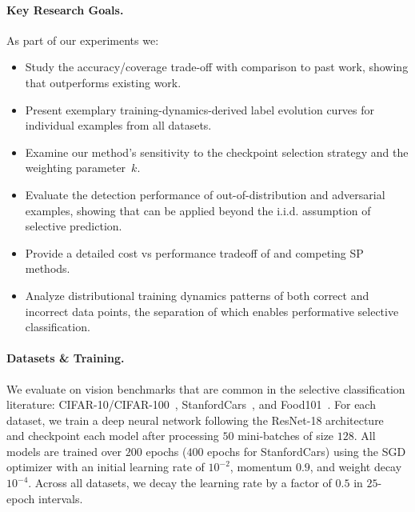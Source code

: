 \paragraph{Key Research Goals.} As part of our experiments we:
\begin{itemize}
    \item Study the accuracy/coverage trade-off with comparison to past work, showing that \sptd outperforms existing work.
    \item Present exemplary training-dynamics-derived label evolution curves for individual examples from all datasets.
    \item Examine our method's sensitivity to the checkpoint selection strategy and the weighting parameter~$k$.
    \item Evaluate the detection performance of out-of-distribution and adversarial examples, showing that \sptd can be applied beyond the i.i.d. assumption of selective prediction.
    \item Provide a detailed cost vs performance tradeoff of \sptd and competing SP methods.
    \item Analyze distributional training dynamics patterns of both correct and incorrect data points, the separation of which enables performative selective classification.
\end{itemize} 

\paragraph{Datasets \& Training.} We evaluate \sptd on vision benchmarks that are common in the selective classification literature: CIFAR-10/CIFAR-100~\citep{krizhevsky2009learning}, StanfordCars~\citep{krause20133d}, and Food101~\citep{bossard14}. For each dataset, we train a deep neural network following the ResNet-18 architecture~\citep{he2016deep} and checkpoint each model after processing $50$ mini-batches of size $128$. All models are trained over $200$ epochs ($400$ epochs for StanfordCars) using the SGD optimizer with an initial learning rate of $10^{-2}$, momentum $0.9$, and weight decay $10^{-4}$. Across all datasets, we decay the learning rate by a factor of $0.5$ in $25$-epoch intervals.

